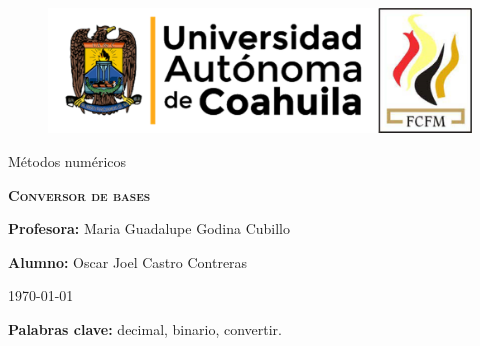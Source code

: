 \documentclass[12pt]{article}
\begin{document}
		
		\begin{titlepage}
		
			\centering
			{\bfseries
			\begin{figure}[h!]
				\centering
				\includegraphics[width=\linewidth]{Nom_UAdeC_FCFM.png} 				
			\end{figure}
			\par}
			\vspace{1cm}
			{\LARGE Métodos numéricos \par}
			\vfill
			{\scshape\Huge \textbf{Conversor de bases} \par}
			\vfill
			{\LARGE \textbf{Profesora:} Maria Guadalupe Godina Cubillo \par}
			\vfill
			{\LARGE \textbf{Alumno:} Oscar Joel Castro Contreras \par}
			\vfill
			{\Large \today \par}
			\thispagestyle{empty}
			
		\end{titlepage}
	
		\newpage
		
		\begin{abstract}
			\noindent En este reporte explico lo que es un sistema numérico, los tipos de sistemas numéricos, como se 
			convierte un número decimal a binario y viceversa y muestro las partes importantes de mi programa 
			en Python hace la conversión de un número de base 10 a uno de base 2 y viceversa.
		\end{abstract}

		\textbf{Palabras clave:} decimal, binario, convertir.
\end{document}
